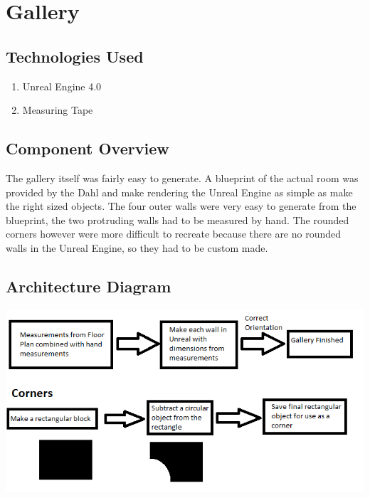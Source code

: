 \section{Gallery}

\subsection{Technologies  Used}
\begin{enumerate}
\item Unreal Engine 4.0
\item Measuring Tape
\end{enumerate}


\subsection{Component  Overview}
The gallery itself was fairly easy to generate.  A blueprint of the actual room was provided by the Dahl and make rendering the Unreal Engine as simple as make the right sized objects.  The four outer walls were very easy to generate from the blueprint, the two protruding walls had to be measured by hand. The rounded corners however were more difficult to recreate because there are no rounded walls in the Unreal Engine, so they had to be custom made.  


\subsection{ Architecture  Diagram}
\includegraphics[scale=1.0]{Diagrams/GalleryDiagram.png}


